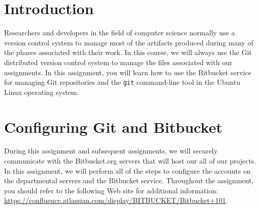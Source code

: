 
\usepackage[compact]{titlesec}




\section*{Introduction}

  Researchers and developers in the field of computer science normally use a version control system to manage most of the
  artifacts produced during many of the phases associated with their work. In this course, we will always use the Git
  distributed version control system to manage the files associated with our assignments.  In this assignment, you will
  learn how to use the Bitbucket service for managing Git repositories and the {\tt git} command-line tool in the Ubuntu
  Linux operating system.


\section*{Configuring Git and Bitbucket}

During this assignment and subsequent assignments, we will securely communicate with the Bitbucket.org servers that will
host our all of our projects.  In this assignment, we will perform all of the steps to configure the accounts
on the departmental servers and the Bitbucket service.  Throughout the assignment, you should refer to the following Web
site for additional information: \url{https://confluence.atlassian.com/display/BITBUCKET/Bitbucket+101}.

